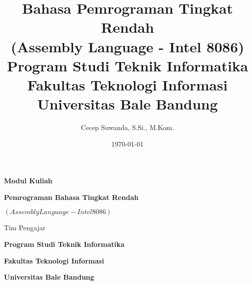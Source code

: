\documentclass[12pt,a4paper,oneside]{book}
\title{Bahasa Pemrograman Tingkat Rendah\\(Assembly Language - Intel 8086)\\\large Program Studi Teknik Informatika\\Fakultas Teknologi Informasi\\Universitas Bale Bandung}
\author{Cecep Suwanda, S.Si., M.Kom.}
\date{\today}
\numberwithin{equation}{chapter}
\theoremstyle{definition}
\theoremstyle{plain}
\begin{document}
\frontmatter
\hypersetup{pageanchor=false}
\begin{titlepage}
  \centering
  \vspace*{2cm}
  
  {\huge\bfseries Modul Kuliah\par}
  \vspace{0.2cm}
  {\huge\bfseries Pemrograman Bahasa Tingkat Rendah\par}
  \vspace{0.2cm}
  {\LARGE\bfseries \((Assembly Language - Intel 8086)\)\par}
  
  
  \vfill
  
  {\large Tim Pengajar \par}
  
  \vfill
  
  {\large\bfseries Program Studi Teknik Informatika\par}
  \vspace{0.2cm}
  {\large\bfseries Fakultas Teknologi Informasi\par}
  \vspace{0.2cm}
  {\large\bfseries Universitas Bale Bandung\par}
  \vspace{0.2cm}
  {\large \the\year\par}
  
  \vspace{1cm}
\end{titlepage}
\hypersetup{pageanchor=true}
\tableofcontents
\newpage
\listoftables
{}
\newpage
\renewcommand{\lstlistlistingname}{Daftar Source Code}
\lstlistoflistings
{}
\newpage
\mainmatter






%
%
%
%

\backmatter
\printbibliography[title={Daftar Pustaka}]
\end{document}
